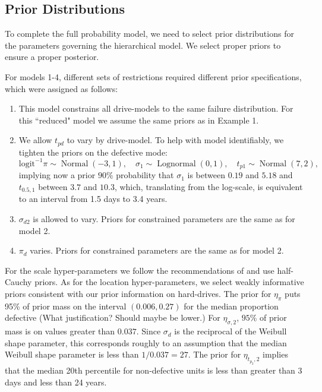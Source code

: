 \documentclass[12pt]{article}
\newcommand{\op}{\operatorname}
\begin{document}
\subsection{Prior Distributions}
\label{sec:Prior Distributions}
To complete the full probability model, we need to select prior distributions for the parameters governing the hierarchical model. We select proper priors to ensure a proper posterior.

For models 1-4, different sets of restrictions required different prior specifications, which were assigned as follows:

\begin{enumerate}
\item This model constrains all drive-models to the same failure distribution. For this ``reduced" model we assume the same priors as in Example 1.

\item We allow $t_{pd}$ to vary by drive-model. To help with model identifiably, we tighten the priors on the defective mode:
$$ \mbox{logit}^{-1}\pi \sim \op{Normal}(-3,1),\quad \sigma_1 \sim \op{Lognormal}(0, 1), \quad t_{p1} \sim \op{Normal}(7,2),$$
implying now a prior $90\%$ probability that $\sigma_1$ is between $0.19$ and $5.18$ and $t_{0.5,1}$ between $3.7$ and $10.3$, which, translating from the log-scale, is equivalent to an interval from 1.5 days to 3.4 years.

\item $\sigma_{d2}$ is allowed to vary. Priors for constrained parameters are the same as for model 2.

\item $\pi_d$ varies. Priors for constrained parameters are the same as for model 2.

\end{enumerate}

For the scale hyper-parameters we follow the recommendations of \citet{gelman2014bayesian} and use half-Cauchy priors. As for the location hyper-parameters, we select weakly informative priors consistent with our prior information on hard-drives. The prior for $\eta_\pi$ puts 95\% of prior mass on the interval $(0.006, 0.27)$ for the median proportion defective (What justification? Should maybe be lower.) For $\eta_{\sigma, 2}$, $95\%$ of prior mass is on values greater than $0.037$. Since $\sigma_d$ is the reciprocal of the Weibull shape parameter, this corresponds roughly to an assumption that the median Weibull shape parameter is less than $1/0.037 = 27$. The prior for $\eta_{t_{p_2},2}$ implies that the median 20th percentile for non-defective units is less than greater than 3 days and less than 24 years.
\end{document}
